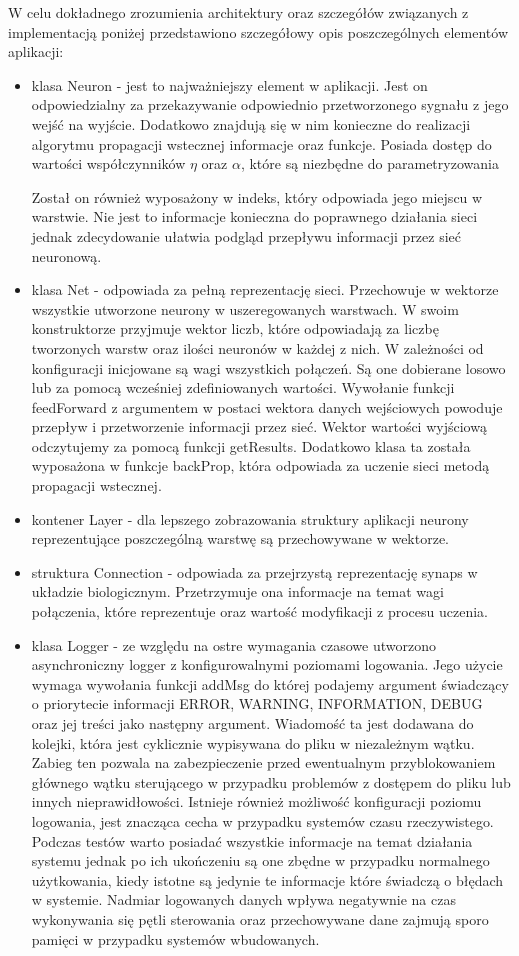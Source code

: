 W celu dokładnego zrozumienia architektury oraz szczegółów związanych z implementacją poniżej przedstawiono szczegółowy opis poszczególnych elementów aplikacji:
\begin{itemize}
	\item klasa Neuron - jest to najważniejszy element w aplikacji. Jest on odpowiedzialny za przekazywanie odpowiednio przetworzonego sygnału z jego wejść na wyjście. Dodatkowo znajdują się w nim konieczne do realizacji algorytmu propagacji wstecznej informacje oraz funkcje. Posiada dostęp do wartości współczynników $\eta$ oraz $\alpha$, które są niezbędne do parametryzowania 
	
	
	Został on również wyposażony w indeks, który odpowiada jego miejscu w warstwie. Nie jest to informacje konieczna do poprawnego działania sieci jednak zdecydowanie ułatwia podgląd przepływu informacji przez sieć neuronową.  
	\item klasa Net - odpowiada za pełną reprezentację sieci. Przechowuje w wektorze wszystkie utworzone neurony w uszeregowanych warstwach. W swoim konstruktorze przyjmuje wektor liczb, które odpowiadają za liczbę tworzonych warstw oraz ilości neuronów w każdej z nich. W zależności od konfiguracji inicjowane są wagi wszystkich połączeń. Są one dobierane losowo lub za pomocą wcześniej zdefiniowanych wartości. Wywołanie funkcji feedForward z argumentem w postaci wektora danych wejściowych powoduje przepływ i przetworzenie informacji przez sieć. Wektor wartości wyjściową odczytujemy za pomocą funkcji getResults. Dodatkowo klasa ta została wyposażona w funkcje backProp, która odpowiada za uczenie sieci metodą propagacji wstecznej. 
	\item kontener Layer - dla lepszego zobrazowania struktury aplikacji neurony reprezentujące poszczególną warstwę są przechowywane w wektorze. 
	\item struktura Connection - odpowiada za przejrzystą reprezentację synaps w układzie biologicznym. Przetrzymuje ona informacje na temat wagi połączenia, które reprezentuje oraz wartość modyfikacji z procesu uczenia.
	\item klasa Logger - ze względu na ostre wymagania czasowe utworzono asynchroniczny logger z konfigurowalnymi poziomami logowania. Jego użycie wymaga wywołania funkcji addMsg do której podajemy argument świadczący o priorytecie informacji ERROR, WARNING, INFORMATION, DEBUG oraz jej treści jako następny argument. Wiadomość ta jest dodawana do kolejki, która jest cyklicznie wypisywana do pliku w niezależnym wątku. Zabieg ten pozwala na zabezpieczenie przed ewentualnym przyblokowaniem głównego wątku sterującego w przypadku problemów z dostępem do pliku lub innych nieprawidłowości. Istnieje również możliwość konfiguracji poziomu logowania, jest znacząca cecha w przypadku systemów czasu rzeczywistego. Podczas testów warto posiadać wszystkie informacje na temat działania systemu jednak po ich ukończeniu są one zbędne w przypadku normalnego użytkowania, kiedy istotne są jedynie te informacje które świadczą o błędach w systemie. Nadmiar logowanych danych wpływa negatywnie na czas wykonywania się pętli sterowania oraz przechowywane dane zajmują sporo pamięci w przypadku systemów wbudowanych.

\end{itemize}
